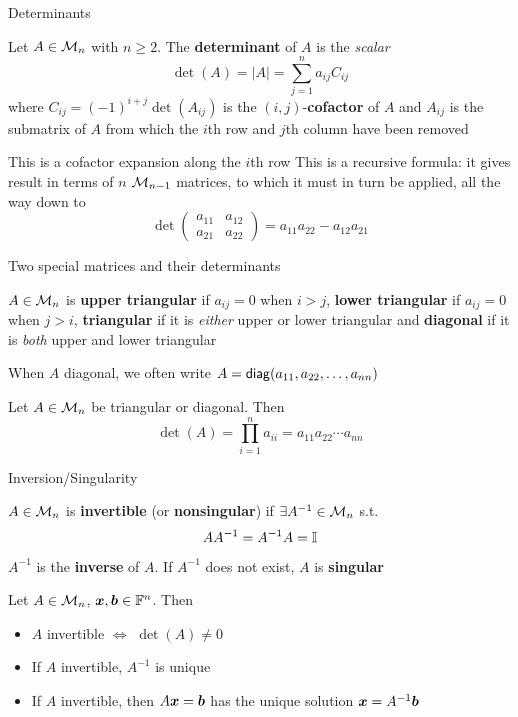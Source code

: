 \documentclass[aspectratio=169]{beamer}\usepackage[]{graphicx}\usepackage[]{xcolor}
\begin{document}
\begin{frame}{Determinants}
\begin{definition}[Determinant]
Let $A\in\mathcal{M}_n$ with $n\geq 2$. The \textbf{determinant} of $A$ is the \emph{scalar}
\[
\det(A)=|A|=\sum_{j=1}^na_{ij}C_{ij}
\]
where $C_{ij}=(-1)^{i+j}\det(A_{ij})$ is the $(i,j)$-\textbf{cofactor} of $A$ and $A_{ij}$ is the submatrix of $A$ from which the $i$th row and $j$th column have been removed
\end{definition}
This is a cofactor expansion along the $i$th row
\vfill
This is a recursive formula: it gives result in terms of $n$ $\mathcal{M}_{n-1}$ matrices, to which it must in turn be applied, all the way down to
\[
\det\left(
\begin{matrix}
a_{11} & a_{12} \\ a_{21} & a_{22}
\end{matrix}\right) = a_{11}a_{22}-a_{12}a_{21}
\]
\end{frame}

\begin{frame}{Two special matrices and their determinants}
\begin{definition}
$A\in\mathcal{M}_n$ is \textbf{upper triangular} if $a_{ij}=0$ when $i>j$, \textbf{lower triangular} if $a_{ij}=0$ when $j>i$, \textbf{triangular} if it is \emph{either} upper or lower triangular and \textbf{diagonal} if it is \emph{both} upper and lower triangular
\end{definition}
When $A$ diagonal, we often write $A=\mathsf{diag}(a_{11},a_{22},\ldots,a_{nn})$
\begin{importanttheorem}
Let $A\in\mathcal{M}_n$ be triangular or diagonal. Then
\[
\det(A)=\prod_{i=1}^n a_{ii}=a_{11}a_{22}\cdots a_{nn}
\]
\end{importanttheorem}
\end{frame}

\begin{frame}{Inversion/Singularity}
\begin{definition}
$A\in\mathcal{M}_n$ is \textbf{invertible} (or \textbf{nonsingular}) if $\exists A^{-1}\in\mathcal{M}_n$ s.t.
\[
AA^{-1}=A^{-1}A=\mathbb{I}
\]
$A^{-1}$ is the \textbf{inverse} of $A$. If $A^{-1}$ does not exist, $A$ is \textbf{singular}
\end{definition}
\begin{importanttheorem}
Let $A\in\mathcal{M}_n$, $\bm{x},\bm{b}\in\mathbb{F}^n$. Then
\begin{itemize}
	\item $A$ invertible $\iff$ $\det(A)\neq 0$
	\item If $A$ invertible, $A^{-1}$ is unique
	\item If $A$ invertible, then $A\bm{x}=\bm{b}$ has the unique solution $\bm{x}=A^{-1}\bm{b}$
\end{itemize}
\end{importanttheorem}
\end{frame}
\end{document}
